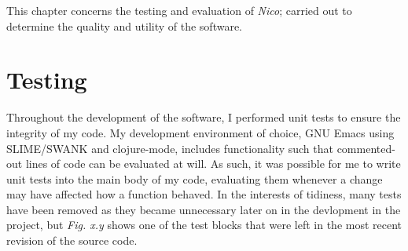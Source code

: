 \documentclass[12pt,twoside,notitlepage,xetex]{report}
\begin{document}
This chapter concerns the testing and evaluation of \emph{Nico}; carried out to determine the quality and utility of the software.

\section{Testing}%

Throughout the development of the software, I performed unit tests to ensure the integrity of my code.  My development environment of choice, GNU Emacs using SLIME/SWANK and clojure-mode, includes functionality such that commented-out lines of code can be evaluated at will.  As such, it was possible for me to write unit tests into the main body of my code, evaluating them whenever a change may have affected how a function behaved.  In the interests of tidiness, many tests have been removed as they became unnecessary later on in the devlopment in the project, but \emph{Fig. x.y} shows one of the test blocks that were left in the most recent revision of the source code.
\end{document}
